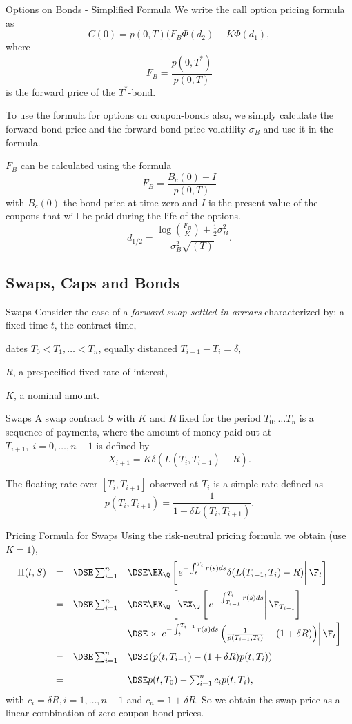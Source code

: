 Options on Bonds - Simplified Formula
	We write the call option pricing formula as
		$$
		C(0) = p(0,T) (F_B \Phi(d_2) - K \Phi(d_1),
		$$
	where
		$$
		F_B=\frac{p(0,T^*)}{p(0,T)}
		$$
	is the forward price of the $T^*$-bond.
 
	To use the formula for options on coupon-bonds also, we simply calculate the forward bond price and the forward bond price volatility $\sigma_B$
	and use it in the formula.

	$F_B$ can be calculated using the formula
		$$
		F_B=\frac{B_c(0)-I}{p(0,T)}
		$$
	with $B_c(0)$ the bond price at time zero and $I$ is the present value of the coupons that will be paid during
	the life of the options.
		$$
		d_{1/2} = \frac{\log\left(\frac{F_B}{K}\right) \pm
		\frac{1}{2} \sigma_B^2}{\sigma^2_B\sqrt{(T)}}.
		$$


\subsection{Swaps, Caps and Bonds}

Swaps
Consider the case of a {\it forward swap settled in arrears} characterized by:
	a fixed time $t$, the  contract time,
	
	dates $T_0 < T_1, \ldots < T_n$, equally distanced $T_{i+1}-T_i = \delta$,
	
	$R$,  a prespecified fixed rate of interest,
	
	$K$,  a nominal amount.


Swaps
	A swap contract $S$ with $K$ and $R$ fixed for the period $T_0,
	\ldots T_n$ is a sequence of payments, where the amount of money
	paid out at $T_{i+1}, \; i=0, \ldots, n-1$ is defined by
		$$
		X_{i+1} = K \delta (L(T_i,T_{i+1})-R).
		$$

	The floating rate over $[T_i, T_{i+1}]$ observed at $T_i$ is a
	simple rate defined as
		$$
		p(T_i, T_{i+1}) = \frac{1}{1 + \delta L(T_i,T_{i+1})}.
		$$


Pricing Formula for  Swaps
	Using the risk-neutral pricing  formula we obtain (use $K=1$),
		{\tiny
		$$
		\begin{array}{llll}
		\Pi(t,S) &=& \DSE \sum_{i=1}^n &\DSE \EX_{\Q}\left[\left.e^{-
		\int_t^{T_i} r(s)ds} \delta(L(T_{i-1},T_{i})-R)\right|\F_t\right]\\*[12pt]
		&=&\DSE \sum_{i=1}^n &\DSE \EX_{\Q}\left[\EX_{\Q}\left[\left.e^{-
		\int_{T_{i-1}}^{T_i}
		r(s)ds}\right|\F_{T_{i-1}}\right]\right.\\*[12pt] & & &\DSE \times
		\left. \left.e^{- \int_t^{T_{i-1}} r(s)ds}
		\left(\frac{1}{p(T_{i-1},T_i)}-(1+ \delta
		R)\right)\right|\F_t\right]\\*[12pt] &=&\DSE \sum_{i=1}^n &\DSE
		\left( p(t,T_{i-1})-(1 + \delta R) p(t,T_i)\right) \\*[12pt]
		&=&&\DSE p(t,T_0) -
		\sum_{i=1}^n c_i p(t,T_i),
		\end{array}
		$$
		}
	with $c_i=\delta R, i=1, \ldots, n-1$ and $c_n = 1+\delta R$. So we obtain the
	swap price as a linear combination of zero-coupon bond prices.


